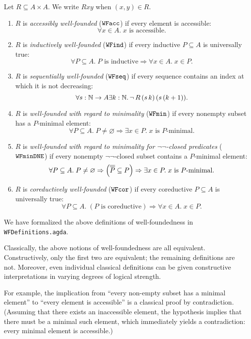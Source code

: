 \begin{definition}
  Let $R \subseteq A \times A$. We write $Rxy$ when $(x,y) \in R$.
  \begin{enumerate}
    \item $R$ is \emph{accessibly well-founded} ($\mathtt{WFacc}$) if every element is accessible:
      \[
        \forall x \in A.\; x \text{ is accessible}.
      \]
    \item $R$ is \emph{inductively well-founded} ($\mathtt{WFind}$) if every inductive $P \subseteq A$ is universally true:
      \[
        \forall P \subseteq A.\;\text{$P$ is inductive} \Rightarrow \forall x \in A.\; x \in P.
      \]
    \item $R$ is \emph{sequentially well-founded} ($\mathtt{WFseq}$) if every sequence contains an index at which it is not decreasing:
      \[
        \forall s : \mathbb{N} \to A \exists k : \mathbb{N}.\, \lnot \, R \,(s\,k)\,(s\,(k+1)).
      \]
    \item  $R$ is \emph{well-founded with regard to minimality} ($\mathtt{WFmin}$) if every nonempty subset has a $P$-minimal element:
      \[
        \forall P \subseteq A.\; P \neq \varnothing \Rightarrow
        \exists x \in P.\; \text{$x$ is $P$-minimal}.
      \]
    \item  $R$ is \emph{well-founded with regard to minimality for $\lnot \lnot$-closed predicates} ($\mathtt{WFminDNE}$) if every nonempty $\lnot \lnot$-closed subset contains a $P$-minimal element:
      \[
        \forall P \subseteq A.\; P \neq \varnothing \Rightarrow \left(\overline{\overline{P}} \subseteq P\right) \Rightarrow
        \exists x \in P.\; \text{$x$ is $P$-minimal}.
      \]
    \item $R$ is \emph{coreductively well-founded} ($\mathtt{WFcor}$) if every coreductive $P \subseteq A$ is universally true:
      \[
        \forall P \subseteq A.\;(\text{$P$ is coreductive}) \Rightarrow \forall x \in A.\; x \in P.
      \]
      
  \end{enumerate}
\end{definition}
We have formalized the above definitions of well-foundedness in \texttt{WFDefinitions.agda}. 

Classically, the above notions of well-foundedness are all equivalent.  Constructively, only the first two are equivalent; the remaining definitions are not. Moreover, even individual classical definitions can be given constructive
interpretations in varying degrees of logical strength.

For example, the implication from ``every non-empty subset has a minimal element'' to
``every element is accessible''  is a classical proof by contradiction.
(Assuming that there exists an inaccessible element, the hypothesis implies that
there must be a minimal such element, which immediately yields a contradiction:
every minimal element is accessible.)

